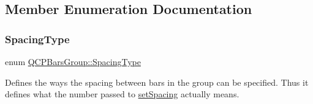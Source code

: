 \subsection{Member Enumeration Documentation}
\mbox{\label{class_q_c_p_bars_group_a4c0521120a97e60bbca37677a37075b6}} 
\subsubsection{\texorpdfstring{Spacing\+Type}{SpacingType}}
{\footnotesize\ttfamily enum \mbox{\hyperlink{class_q_c_p_bars_group_a4c0521120a97e60bbca37677a37075b6}{Q\+C\+P\+Bars\+Group\+::\+Spacing\+Type}}}

Defines the ways the spacing between bars in the group can be specified. Thus it defines what the number passed to \mbox{\hyperlink{class_q_c_p_bars_group_aa553d327479d72a0c3dafcc724a190e2}{set\+Spacing}} actually means.

